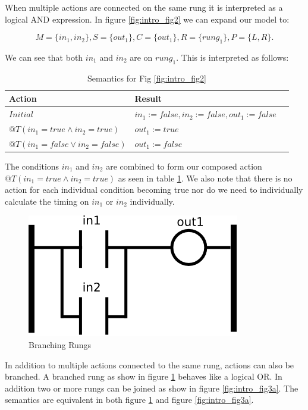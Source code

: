 When multiple actions are connected on the same rung it is interpreted as a logical AND 
expression. In figure \ref{fig:intro_fig2} we can expand our model to:

$$M=\lbrace in_1, in_2 \rbrace, S=\lbrace out_1 \rbrace, C=\lbrace out_1 \rbrace, R=\lbrace rung_1 \rbrace, P=\lbrace L,R \rbrace.$$

We can see that both $in_1$ and $in_2$ are on $rung_1$. This is interpreted as follows:

\begin{table}[htp]
    \centering
       \begin{tabular}{|l|l|l|}
        \hline
        Action & Result \\
        \hline
        $Initial$ & $in_1 := false, in_2 := false, out_1 := false$\\
        \hline
        $@T(in_1 = true \wedge in_2 = true)$ & $out_1 := true$ \\
        \hline
        $@T(in_1 = false \vee in_2 = false)$ & $out_1 := false$ \\
        \hline
    \end{tabular}
    \caption{Semantics for Fig \ref{fig:intro_fig2}}
    \label{table:table_for_fig2}
\end{table}

The conditions $in_1$ and $in_2$ are combined to form our composed action $@T(in_1 = true \wedge in_2 = true)$ 
as seen in table \ref{table:table_for_fig2}. We also note that there is no action for each individual condition
becoming true nor do we need to individually calculate the timing on $in_1$ or $in_2$ individually.

\begin{figure}[htp]
    \centering
    \includegraphics[width=\imgsmall]{./images/intro_fig3.png}
    \caption{Branching Rungs}
    \label{fig:intro_fig3}
\end{figure}


In addition to multiple actions connected to the same rung, actions can also be branched. A branched rung as
show in figure \ref{fig:intro_fig3} behaves like a logical OR. In addition two or more rungs can be joined
as show in figure \ref{fig:intro_fig3a}. The semantics are equivalent in both figure \ref{fig:intro_fig3} and 
figure \ref{fig:intro_fig3a}.

